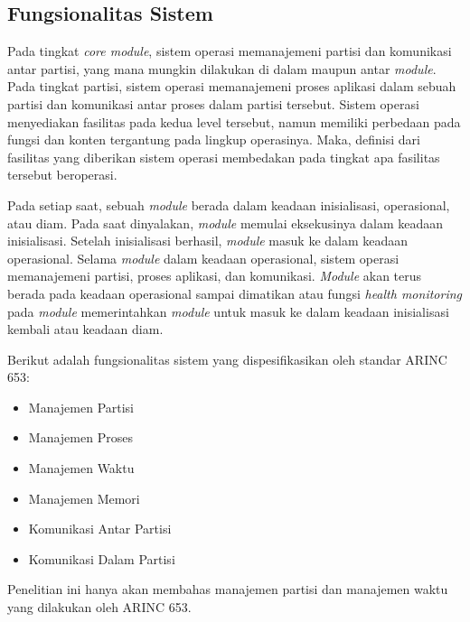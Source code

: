 \subsection{Fungsionalitas Sistem}

Pada tingkat \textit{core module}, sistem operasi memanajemeni partisi dan komunikasi antar
partisi, yang mana mungkin dilakukan di dalam maupun antar \textit{module}.  Pada tingkat
partisi, sistem operasi memanajemeni proses aplikasi dalam sebuah partisi dan komunikasi antar
proses dalam partisi tersebut.  Sistem operasi menyediakan fasilitas pada kedua level tersebut,
namun memiliki perbedaan pada fungsi dan konten tergantung pada lingkup operasinya.  Maka,
definisi dari fasilitas yang diberikan sistem operasi membedakan pada tingkat apa fasilitas
tersebut beroperasi.

Pada setiap saat, sebuah \textit{module} berada dalam keadaan inisialisasi, operasional, atau
diam.  Pada saat dinyalakan, \textit{module} memulai eksekusinya dalam keadaan inisialisasi.
Setelah inisialisasi berhasil, \textit{module} masuk ke dalam keadaan operasional.  Selama
\textit{module} dalam keadaan operasional, sistem operasi memanajemeni partisi, proses aplikasi,
dan komunikasi.  \textit{Module} akan terus berada pada keadaan operasional sampai dimatikan
atau fungsi \textit{health monitoring} pada \textit{module} memerintahkan \textit{module} untuk
masuk ke dalam keadaan inisialisasi kembali atau keadaan diam.

Berikut adalah fungsionalitas sistem yang dispesifikasikan oleh standar ARINC 653:

\begin{itemize}

    \item Manajemen Partisi

    \item Manajemen Proses

    \item Manajemen Waktu

    \item Manajemen Memori

    \item Komunikasi Antar Partisi

    \item Komunikasi Dalam Partisi

\end{itemize}

Penelitian ini hanya akan membahas manajemen partisi dan manajemen waktu yang dilakukan oleh
ARINC 653.

